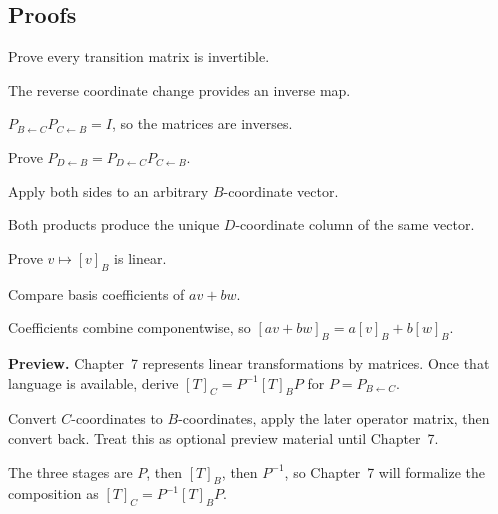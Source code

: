 \subsection*{Proofs}

\begin{exercise}\label{exr:i04-expand-06}
Prove every transition matrix is invertible.
\end{exercise}
\begin{hint}
The reverse coordinate change provides an inverse map.
\end{hint}
\begin{solution}
\(P_{B\leftarrow C}P_{C\leftarrow B}=I\), so the matrices are inverses.
\end{solution}

\begin{exercise}\label{exr:i04-expand-07}
Prove \(P_{D\leftarrow B}=P_{D\leftarrow C}P_{C\leftarrow B}\).
\end{exercise}
\begin{hint}
Apply both sides to an arbitrary \(B\)-coordinate vector.
\end{hint}
\begin{solution}
Both products produce the unique \(D\)-coordinate column of the same vector.
\end{solution}

\begin{exercise}\label{exr:i04-expand-08}
Prove \(v\mapsto[v]_B\) is linear.
\end{exercise}
\begin{hint}
Compare basis coefficients of \(av+bw\).
\end{hint}
\begin{solution}
Coefficients combine componentwise, so \([av+bw]_B=a[v]_B+b[w]_B\).
\end{solution}

\begin{exercise}\label{exr:i04-expand-09}
\textbf{Preview.} Chapter~7 represents linear transformations by matrices. Once that language is available, derive $[T]_C=P^{-1}[T]_B P$ for $P=P_{B\leftarrow C}$.
\end{exercise}
\begin{hint}
Convert $C$-coordinates to $B$-coordinates, apply the later operator matrix, then convert back. Treat this as optional preview material until Chapter~7.
\end{hint}
\begin{solution}
The three stages are $P$, then $[T]_B$, then $P^{-1}$, so Chapter~7 will formalize the composition as $[T]_C=P^{-1}[T]_BP$.
\end{solution}

